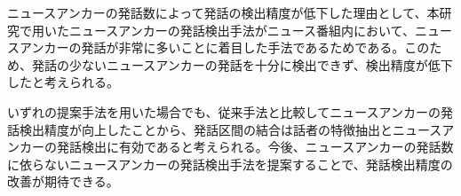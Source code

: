 ニュースアンカーの発話数によって発話の検出精度が低下した理由として、本研究で用いたニュースアンカーの発話検出手法がニュース番組内において、ニュースアンカーの発話が非常に多いことに着目した手法であるためである。このため、発話の少ないニュースアンカーの発話を十分に検出できず、検出精度が低下したと考えられる。\par

いずれの提案手法を用いた場合でも、従来手法と比較してニュースアンカーの発話検出精度が向上したことから、発話区間の結合は話者の特徴抽出とニュースアンカーの発話検出に有効であると考えられる。今後、ニュースアンカーの発話数に依らないニュースアンカーの発話検出手法を提案することで、発話検出精度の改善が期待できる。

\begin{comment}
本稿では、ニュース番組音声のインデクス自動付与に向けたダイアライゼーション実現のために、発話間隔と発話環境を考慮したi-vectorを用いたニュースアンカーの発話検出精度向上を目指した。\par
特定話者の識別にはi-vectorが一般的に用いられるが、短い発話からは話者の識別に必要な十分な話者の特徴を抽出できない。そのため、本稿では前後の発話区間が同一話者の発話である可能性が高いとき発話区間を結合し、長い発話を擬似的に作成した。次に、結合した発話区間からi-vectorを抽出することで短い発話から得られるi-vectorの抽出精度向上を目指した。発話区間の結合には、同一話者が連続で発話する場合間をおかずに発話すること、話者が切り替わった時に発話環境が変化することに着目し、発話と発話の時間間隔を考慮する手法と、発話者の発話環境を考慮する手法を用いた。以上の手法を用いて結合した発話区間から抽出したi-vectorを用いてニュースアンカーの発話検出を行った結果、発話検出精度が約6\%向上し、ニュースアンカーの発話検出への有意性を示した。しかし、ニュースアンカーの発話数が少ないニュース番組においてはアンカーの検出精度が著しく低下した。このため、ニュースアンカーの発話が少ない場合においても発話を検出する手法を提案する必要がある。\par
また、本研究で抽出したi-vectorを用いてニュースアンカーの音声認識を行なった。音声認識はニュースアンカーの発話区間が既知の場合と未知の場合で行い、発話区間が既知のときは音声認識精度の向上が確認できなかった。ニュースアンカーの発話区間が未知の場合、従来と比較してニュースアンカーの発話区間検出精度が向上したことが音声認識精度の向上に繋がった。\par
今後の課題として、ニュースアンカーの発話が少ない番組におけるニュースアンカーの発話検出精度の向上が必要である。これは、発話内容などi-vector以外のニュースアンカーの特徴を考慮する必要があると考えられる。また、音声認識においては、ニュース音声の背景雑音の除去、雑音に頑健な音響モデルの作成が挙げられる。ニュースアンカーはスタジオで発話しているため基本的には音声以外は入らないが、参考映像などの音が発話中に流れることがある。そのため、雑音、音楽に対して音源分離による雑音除去や、雑音や音楽が含まれた学習データを用いて音響モデルを学習することで、音声認識精度が向上すると考えられる。
\end{comment}
